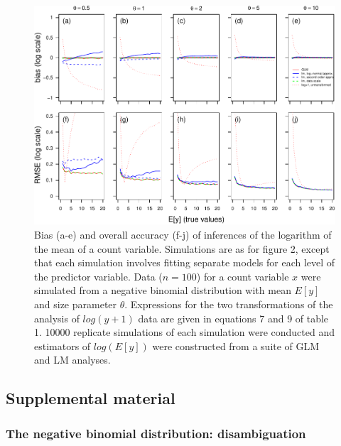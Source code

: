 \documentclass[]{article}
\begin{document}
\begin{figure}[h]

{\centering \includegraphics{revisiting_count_data_advice_files/figure-latex/biasAndRmseFigureLogSeparateModels-1} 

}

\caption{Bias (a-e) and overall accuracy (f-j) of inferences of the logarithm of the mean of a count variable.  Simulations are as for figure 2, except that each simulation involves fitting separate models for each level of the predictor variable.  Data ($n=100$) for a count variable $x$ were simulated from a negative binomial distribution with mean $E[y]$ and size parameter $\theta$.  Expressions for the two transformations of the analysis of $log(y+1)$ data are given in equations 7 and 9 of table 1.  10000 replicate simulations of each simulation were conducted and estimators of $log(E[y])$ were constructed from a suite of GLM and LM analyses.}\label{fig:biasAndRmseFigureLogSeparateModels}
\end{figure}

\clearpage
\setcounter{figure}{0} \setcounter{equation}{0} \makeatletter 
\renewcommand{\thefigure}{S.\@arabic\c@figure}
\renewcommand{\theequation}{S.\@arabic\c@equation} \makeatother

\subsection{Supplemental material}\label{supplemental-material}

\subsubsection{The negative binomial distribution:
disambiguation}\label{the-negative-binomial-distribution-disambiguation}
\end{document}

